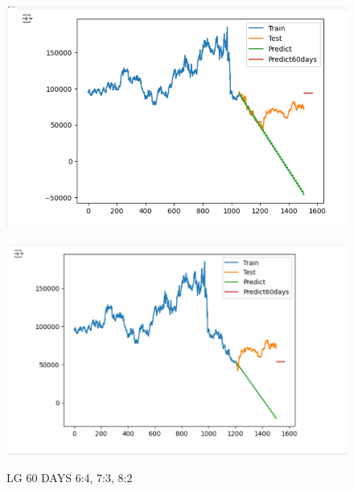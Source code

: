 \documentclass{article}
\begin{document}
\begin{multicols}{2}
\begin{figure}[H]
\begin{minipage}{0.15\textwidth}
    \label{fig:1}
    \end{minipage}%
    \begin{minipage}{0.15\textwidth}
    \centering
    \includegraphics[width=1\textwidth]{Image/ARIMA/60_7_3_LG_Arima.png}
  
    \label{fig:2}
    \end{minipage}%
    \begin{minipage}{0.15\textwidth}
    \centering
    \includegraphics[width=1\textwidth]{Image/ARIMA/60_8_2_LG_Arima.png}

    \label{fig:3}
    \end{minipage}
    \caption{LG 60 DAYS  6:4, 7:3, 8:2 }
\end{figure}


\end{multicols}
\end{document}

